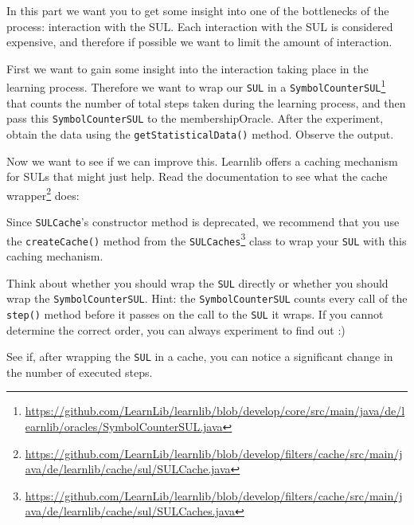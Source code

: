 \documentclass[a4paper]{article}
\begin{document}
In this part we want you to get some insight into one of the bottlenecks of the process: interaction with the SUL. Each interaction with the SUL is considered expensive, and therefore if possible we want to limit the amount of interaction.
 
First we want to gain some insight into the interaction taking place in the learning process. Therefore we want to wrap our \texttt{SUL} in a \texttt{SymbolCounterSUL}\footnote{\url{https://github.com/LearnLib/learnlib/blob/develop/core/src/main/java/de/learnlib/oracles/SymbolCounterSUL.java}} that counts the number of total steps taken during the learning process, and then pass this \texttt{SymbolCounterSUL} to the membershipOracle. After the experiment, obtain the data using the \texttt{getStatisticalData()} method. Observe the output.

Now we want to see if we can improve this. Learnlib offers a caching mechanism for SULs that might just help. Read the documentation to see what the cache wrapper\footnote{\url{https://github.com/LearnLib/learnlib/blob/develop/filters/cache/src/main/java/de/learnlib/cache/sul/SULCache.java}} does:


Since \texttt{SULCache}'s constructor method is deprecated, we recommend that you use the \texttt{createCache()} method from the \texttt{SULCaches}\footnote{\url{https://github.com/LearnLib/learnlib/blob/develop/filters/cache/src/main/java/de/learnlib/cache/sul/SULCaches.java}} class to wrap your \texttt{SUL} with this caching mechanism. 


Think about whether you should wrap the \texttt{SUL} directly or whether you should wrap the \texttt{SymbolCounterSUL}. Hint: the \texttt{SymbolCounterSUL} counts every call of the \texttt{step()} method before it passes on the call to the \texttt{SUL} it wraps. If you cannot determine the correct order, you can always experiment to find out :)

See if, after wrapping the \texttt{SUL} in a cache, you can notice a significant change in the number of executed steps.
\end{document}
